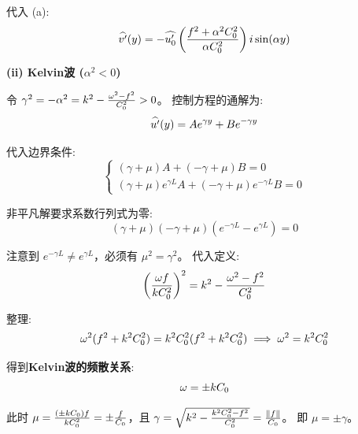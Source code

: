 \begin{enumerate}
    代入 (a):
    \begin{equation*}
        \widehat{v^\prime}(y) = -\widehat{u_0^\prime} \left(\frac{f^2 + \alpha^2 C_0^2}{\alpha C_0^2}\right) i \sin(\alpha y)
    \end{equation*}

    \textbf{(ii) Kelvin波 ($\alpha^2 < 0$)}

    令 $\gamma^2 = -\alpha^2 = k^2 - \frac{\omega^2 - f^2}{C_0^2} > 0$。
    控制方程的通解为:
    \begin{equation*}
        \widehat{u^\prime}(y) = A e^{\gamma y} + B e^{-\gamma y}
    \end{equation*}

    代入边界条件:
    \begin{equation*}
        \begin{cases}
            (\gamma + \mu) A + (-\gamma + \mu) B = 0 \\
            (\gamma + \mu) e^{\gamma L} A + (-\gamma + \mu) e^{-\gamma L} B = 0
        \end{cases}
    \end{equation*}

    非平凡解要求系数行列式为零:
    \begin{equation*}
        (\gamma + \mu)(-\gamma + \mu) (e^{-\gamma L} - e^{\gamma L}) = 0
    \end{equation*}

    注意到 $e^{-\gamma L} \neq e^{\gamma L}$，必须有 $\mu^2 = \gamma^2$。
    代入定义:
    \begin{equation*}
        \left(\frac{\omega f}{k C_0^2}\right)^2 = k^2 - \frac{\omega^2 - f^2}{C_0^2}
    \end{equation*}

    整理:
    \begin{equation*}
        \omega^2 (f^2 + k^2 C_0^2) = k^2 C_0^2 (f^2 + k^2 C_0^2) \implies \omega^2 = k^2 C_0^2
    \end{equation*}

    得到\textbf{Kelvin波的频散关系}:
    \begin{equation*}
        \omega = \pm k C_0
    \end{equation*}

    此时 $\mu = \frac{(\pm k C_0) f}{k C_0^2} = \pm \frac{f}{C_0}$，且 $\gamma = \sqrt{k^2 - \frac{k^2 C_0^2 - f^2}{C_0^2}} = \frac{\lVert f \rVert}{C_0}$。
    即 $\mu = \pm \gamma$。


\end{enumerate}
